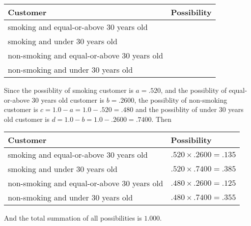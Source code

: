 \documentclass[12pt]{article}
\begin{document}
\noindent
\begin{tabular}{|l|l|}
\hline
Customer & Possibility \\
\hline
smoking  and   %
equal-or-above 30 years old  & \\
\hline
smoking  and   %
under 30 years old & \\
\hline
 non-smoking and   %
equal-or-above 30 years old  & \\
\hline
 non-smoking and  %
under 30 years old & \\
\hline
\end{tabular}
 
 
 
 
 
\noindent{}
 
 

Since the possiblity of  %
smoking customer is $ a =  %
.520 $,
and the possiblity of  %
equal-or-above 30 years old customer is $ b =  %
.2600 $,
the possiblity of  %
non-smoking customer is $ c = 1.0 - a = 1.0 -
.520
=  %
.480 $ and the possiblity of  %
under 30 years old
customer is $ d = 1.0 - b = 1.0 -  %
.2600 =  %
.7400  $.
Then
 
\noindent
\begin{tabular}{|l|l|}
\hline
Customer & Possibility \\
\hline
smoking  and  %
equal-or-above 30 years old  &
  $ %
.520 \times  %
.2600 =  %
.135$ \\
\hline
smoking  and  %
under 30 years old &
  $ %
.520 \times  %
.7400 =  %
.385$ \\
\hline
 non-smoking and  %
equal-or-above 30 years old  &
  $ %
.480 \times  %
.2600 =  %
.125$ \\
\hline
 non-smoking and  %
under 30 years old &
  $ %
.480 \times  %
.7400 =  %
.355$ \\
\hline
\end{tabular}
 
\noindent
And the total summation of all possibilities is $  %
1.000 $.
 
 
 
 
\noindent{}
 
 

 
 
 
\noindent{}
 
\end{document}
